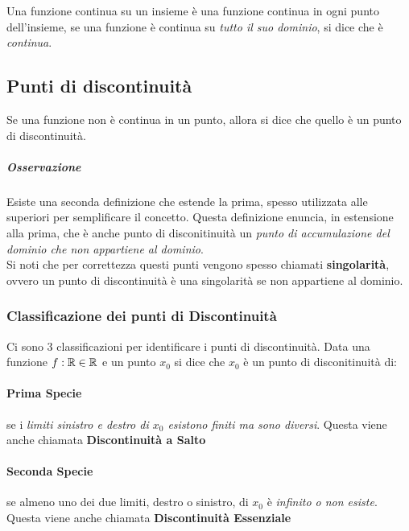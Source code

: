 \documentclass[12pt, a4paper, openany]{book}
\begin{document}
	Una funzione continua su un insieme è una funzione continua in ogni punto dell'insieme, se una funzione è continua su \emph{tutto il suo dominio}, si dice che è \emph{continua}.

	\subsection*{Punti di discontinuità}
	Se una funzione non è continua in un punto, allora si dice che quello è un punto di discontinuità.


	\subparagraph*{Osservazione} Esiste una seconda definizione che estende la prima, spesso utilizzata alle superiori per semplificare il concetto.
	Questa definizione enuncia, in estensione alla prima, che è anche punto di disconitinuità un \emph{punto di accumulazione del dominio che non appartiene al dominio}.
	\\Si noti che per correttezza questi punti vengono spesso chiamati \textbf{singolarità}, ovvero un punto di discontinuità è una singolarità se non appartiene al dominio.
	\subsubsection*{Classificazione dei punti di Discontinuità}
	Ci sono 3 classificazioni per identificare i punti di discontinuità.
	Data una funzione $f:\mathbb{R} \in \mathbb{R}$ e un punto $x_0$ si dice che $x_0$ è un punto di disconitinuità di:
	\paragraph{Prima Specie} se i \emph{limiti sinistro e destro di $x_0$ esistono finiti ma sono diversi}.
	Questa viene anche chiamata \textbf{Discontinuità a Salto}
	\paragraph{Seconda Specie} se almeno uno dei due limiti, destro o sinistro, di $x_0$ è \emph{infinito o non esiste}.
	Questa viene anche chiamata \textbf{Discontinuità Essenziale}
\end{document}
